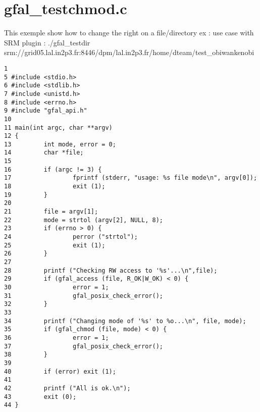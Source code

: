 \section{gfal\_\-testchmod.c}
This exemple show how to change the right on a file/directory ex : use case with SRM plugin : ./gfal\_\-testdir srm://grid05.lal.in2p3.fr:8446/dpm/lal.in2p3.fr/home/dteam/test\_\-obiwankenobi



\begin{DocInclude}\begin{verbatim}1 
5 #include <stdio.h>
6 #include <stdlib.h>
7 #include <unistd.h>
8 #include <errno.h>
9 #include "gfal_api.h"
10 
11 main(int argc, char **argv)
12 {
13         int mode, error = 0;
14         char *file;
15 
16         if (argc != 3) {
17                 fprintf (stderr, "usage: %s file mode\n", argv[0]);
18                 exit (1);
19         }
20 
21         file = argv[1];
22         mode = strtol (argv[2], NULL, 8);
23         if (errno > 0) {
24                 perror ("strtol");
25                 exit (1);
26         }
27 
28         printf ("Checking RW access to '%s'...\n",file);
29         if (gfal_access (file, R_OK|W_OK) < 0) {
30                 error = 1;
31                 gfal_posix_check_error();
32         }
33 
34         printf ("Changing mode of '%s' to %o...\n", file, mode);
35         if (gfal_chmod (file, mode) < 0) {
36                 error = 1;
37                 gfal_posix_check_error();
38         }
39 
40         if (error) exit (1);
41 
42         printf ("All is ok.\n");
43         exit (0);
44 }
\end{verbatim}
\end{DocInclude}
 